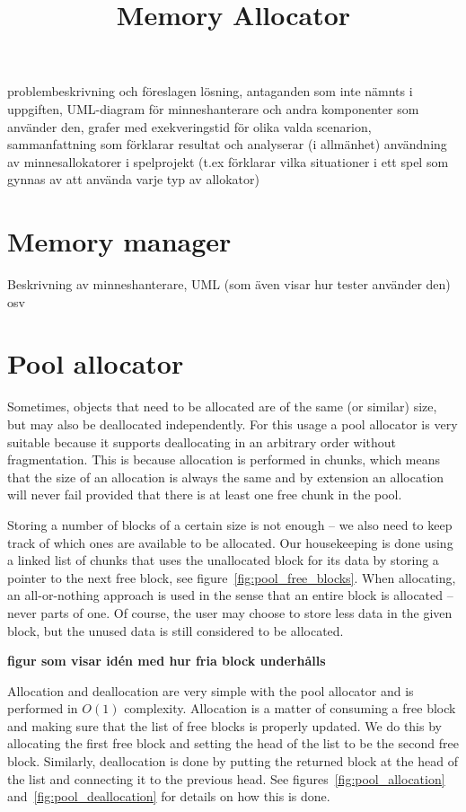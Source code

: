 \documentclass{article}
\title{Memory Allocator}
\begin{document}
\maketitle
\thispagestyle{empty}
\newpage

\tableofcontents
\thispagestyle{empty}
\newpage

\setcounter{page}{1}

problembeskrivning och föreslagen lösning, antaganden som inte nämnts i uppgiften, UML-diagram för minneshanterare och andra komponenter som använder den, grafer med exekveringstid för olika valda scenarion, sammanfattning som förklarar resultat och analyserar (i allmänhet) användning av minnesallokatorer i spelprojekt (t.ex förklarar vilka situationer i ett spel som gynnas av att använda varje typ av allokator)

\section{Memory manager}
Beskrivning av minneshanterare, UML (som även visar hur tester använder den) osv

\section{Pool allocator}
Sometimes, objects that need to be allocated are of the same (or similar) size, but may also be deallocated independently. For this usage a pool allocator is very suitable because it supports deallocating in an arbitrary order without fragmentation. This is because allocation is performed in chunks, which means that the size of an allocation is always the same and by extension an allocation will never fail provided that there is at least one free chunk in the pool.

Storing a number of blocks of a certain size is not enough -- we also need to keep track of which ones are available to be allocated. Our housekeeping is done using a linked list of chunks that uses the unallocated block for its data by storing a pointer to the next free block, see figure~\ref{fig:pool_free_blocks}. When allocating, an all-or-nothing approach is used in the sense that an entire block is allocated -- never parts of one. Of course, the user may choose to store less data in the given block, but the unused data is still considered to be allocated.

\textbf{figur som visar idén med hur fria block underhålls}

Allocation and deallocation are very simple with the pool allocator and is performed in $O(1)$ complexity. Allocation is a matter of consuming a free block and making sure that the list of free blocks is properly updated. We do this by allocating the first free block and setting the head of the list to be the second free block. Similarly, deallocation is done by putting the returned block at the head of the list and connecting it to the previous head. See figures~\ref{fig:pool_allocation} and~\ref{fig:pool_deallocation} for details on how this is done.
\end{document}
